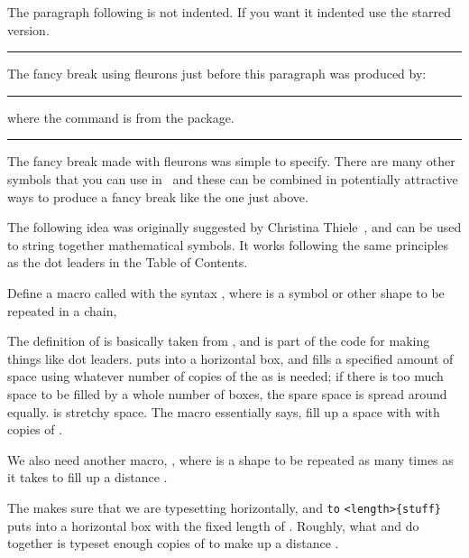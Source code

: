   The paragraph following \cmd{\pfbreak} is not indented. If you want
it indented use the \cmd{\pfbreak*} starred version.

\renewcommand{\pfbreakdisplay}{\ding{167}\quad\ding{167}\quad\ding{167}}
\fancybreak{\pfbreakdisplay}

 The fancy break using 
fleurons just before this paragraph was produced by:
\begin{lcode}
\renewcommand{\pfbreakdisplay}{%
  \ding{167}\quad\ding{167}\quad\ding{167}}
\fancybreak{\pfbreakdisplay}
\end{lcode}
where the \cmd{\ding} command is from the  package.

\makeatletter
\newcommand{\motif}[1]{\cleaders\hbox{#1}\hfil}
\newcommand{\chain}[2]{\leavevmode\hbox to #2{\motif{#1}}}
\newcommand{\diamondpattern}{\m@th$\mkern-.6mu \diamond \mkern-.6mu$}
\makeatother

\fancybreak{\chain{\diamondpattern}{0.25\textwidth}}

    The fancy break made with fleurons was simple to specify. There are 
many other symbols that you can
use in \ltx\ and these can be combined in potentially attractive ways to
produce a fancy break like the one just above.

    The following idea was originally suggested by Christina 
Thiele~\cite{ORNAMENTAL}, and can
be used to string together mathematical symbols. It works following the same
principles as the dot leaders in the Table of Contents.

    Define a macro called with the syntax , where
 is a symbol or other shape to be repeated in a chain,
\begin{lcode}
\newcommand{\motif}[1]{\cleaders\hbox{#1}\hfil}
\end{lcode}
The definition of  is basically taken from \tx, and is part of the
code for making things like dot leaders. \cmd{\hbox} puts
 into a horizontal box, and \cmd{\cleaders} fills
a specified amount of space using whatever number of copies of the 
 as is needed; if there is
too much space to be filled by a whole number of boxes, the spare space
is spread around equally. \cmd{\hfil} is stretchy space. The  macro
essentially says, fill up a space with with copies of .

    We also need another macro, , 
where 
is a shape to be repeated as many times as it takes to fill up a distance
.
\begin{lcode}
\newcommand{\chain}[2]{\leavevmode\hbox to #2{\motif{#1}}}
\end{lcode}
The \cmd{\leavevmode} makes sure that we are typesetting horizontally, and
\cmd{\hbox} \verb?to? \verb?<length>{stuff}? puts  into a horizontal 
box with the
fixed length of . Roughly, what  and 
do together is typeset enough copies of  to make up
a distance . 

